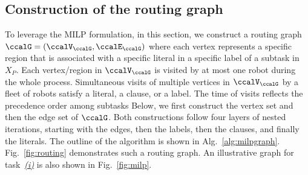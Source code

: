 \documentclass[Afour,sageh,times]{sagej}
\begin{document}
\subsection{Construction of the routing graph}\label{sec:graph}
To leverage the MILP formulation, in this section, we construct a routing graph $\ccalG = (\ccalV_{\ccalG},\ccalE_{\ccalG})$ where each vertex represents a specific region that is associated with a specific literal in a specific label of a subtask in $X_P$. Each vertex/region in $\ccalV_\ccalG$ is visited by at most one robot during the whole process. Simultaneous visits of multiple vertices in $\ccalV_\ccalG$ by a fleet of robots  satisfy a literal, a clause, or a label. The time of visits reflects the precedence order among subtasks  Below, we first construct  the vertex set and then the edge set of $\ccalG$. Both constructions follow four layers of nested iterations, starting with the edges, then the labels, then the clauses, and finally the literals. The outline of the algorithm is shown in Alg.~\ref{alg:milpgraph}.  Fig.~\ref{fig:routing} demonstrates such a routing graph. An illustrative graph for task~\hyperref[task:i]{\it (i)}  is also shown in Fig.~\ref{fig:milp}.
\end{document}
